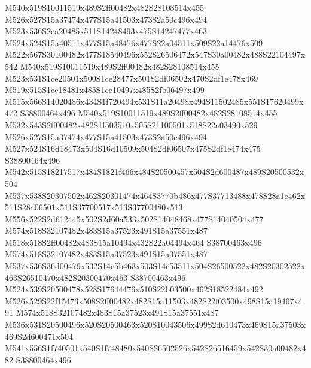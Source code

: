 \documentclass{article}
\begin{document}
\begin{multicols}{2}
M540x519S10011519x489S2ff00482x482S28108514x455 M526x527S15a37474x477S15a41503x473S2a50c496x494 M523x536S2ea20485x511S14248493x475S14247477x463 M524x524S15a40511x477S15a48476x477S22a04511x509S22a14476x509 M522x567S30100482x477S18540496x552S26506472x547S30a00482x488S22104497x542 M540x519S10011519x489S2ff00482x482S28108514x455 M523x531S1ce20501x500S1ce28477x501S2df06502x470S2df1e478x469 M519x515S1ce18481x485S1ce10497x485S2fb06497x499 M515x566S14020486x434S1f720494x531S11a20498x494S11502485x551S17620499x472 S38800464x496 M540x519S10011519x489S2ff00482x482S28108514x455 M532x543S2ff00482x482S1f503510x505S21100501x518S22a03490x529 M526x527S15a37474x477S15a41503x473S2a50c496x494 M527x524S16d18473x504S16d10509x504S2df06507x475S2df1e474x475 S38800464x496 M542x515S18217517x484S1821f466x484S20500457x504S2d600487x489S20500532x504 M537x538S20307502x462S20301474x464S3770b486x477S37713488x478S28a1e462x511S28a06501x511S37700517x513S37700480x513 M556x522S2d612445x502S2d60a533x502S14048468x477S14040504x477 M574x518S32107482x483S15a37523x491S15a37551x487 M518x518S2ff00482x483S15a10494x432S22a04494x464 S38700463x496 M574x518S32107482x483S15a37523x491S15a37551x487 M537x536S36d00479x532S14c5b463x503S14c53511x504S26500522x482S20302522x463S26510470x482S20300470x463 S38700463x496 M524x539S20500478x528S17644476x510S22b03500x462S18522484x492 M526x529S22f15473x508S2ff00482x482S15a11503x482S22f03500x498S15a19467x491 M574x518S32107482x483S15a37523x491S15a37551x487 M536x531S20500496x520S20500463x520S10043506x499S2d610473x469S15a37503x469S2d600471x504 M541x556S1f740501x540S1f748480x540S26502526x542S26516459x542S30a00482x482 S38800464x496








\end{multicols}
\end{document}
